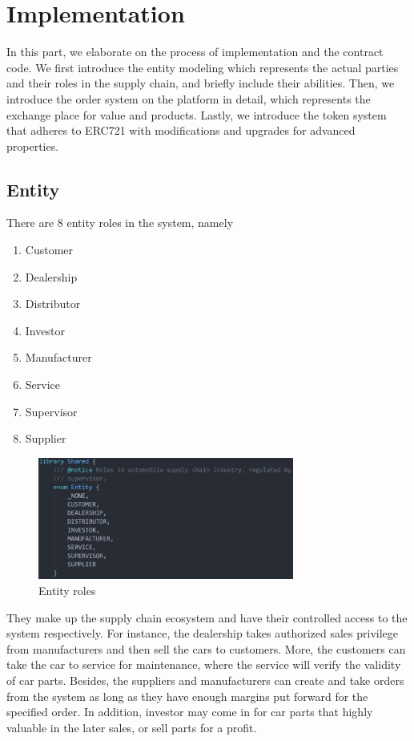 \documentclass[12pt]{article}
\begin{document}
%

\section{Implementation}
In this part, we elaborate on the process of implementation and the contract code. We first introduce the entity modeling which represents the actual parties and their roles in the supply chain, and briefly include their abilities. Then, we introduce the order system on the platform in detail, which represents the exchange place for value and products. Lastly, we introduce the token system that adheres to ERC721 with modifications and upgrades for advanced properties.

\subsection{Entity}
There are 8 entity roles in the system, namely
\begin{enumerate}
    \item Customer
    \item Dealership
    \item Distributor
    \item Investor
    \item Manufacturer
    \item Service
    \item Supervisor
    \item Supplier
\end{enumerate}
\begin{figure}[h]
    \centering
    \includegraphics[width=0.75\textwidth]{entities.jpg}
    \caption{Entity roles}
    \label{fig:entity}
\end{figure}
They make up the supply chain ecosystem and have their controlled access to the system respectively. For instance, the dealership takes authorized sales privilege from manufacturers and then sell the cars to customers. More, the customers can take the car to service for maintenance, where the service will verify the validity of car parts. Besides, the suppliers and manufacturers can create and take orders from the system as long as they have enough margins put forward for the specified order. In addition, investor may come in for car parts that highly valuable in the later sales, or sell parts for a profit.
\end{document}
